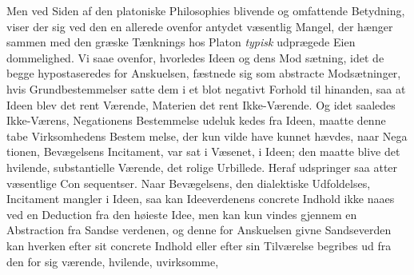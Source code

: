 \documentclass[12pt,a4paper]{book}
\begin{document}
Men ved Siden af den platoniske Philosophies blivende
og omfattende Betydning, viser der sig ved den en allerede
ovenfor antydet væsentlig Mangel, der hænger sammen med
den græske Tænknings hos Platon \emph{typisk} udprægede Eien\-%
dommelighed. Vi saae ovenfor, hvorledes Ideen og dens Mod\-%
sætning, idet de begge hypostaseredes for Anskuelsen, fæstnede
sig som abstracte Modsætninger, hvis Grundbestemmelser satte
dem i et blot negativt Forhold til hinanden, saa at Ideen
blev det rent Værende, Materien det rent Ikke-Værende. Og
idet saaledes Ikke-Værens, Negationens Bestemmelse udeluk\-%
kedes fra Ideen, maatte denne tabe Virksomhedens Bestem\-%
melse, der kun vilde have kunnet hævdes, naar Nega\-%
tionen, Bevægelsens Incitament, var sat i Væsenet, i Ideen;
den maatte blive det hvilende, substantielle Værende, det
rolige Urbillede. Heraf udspringer saa atter væsentlige Con\-%
sequentser. Naar Bevægelsens, den dialektiske Udfoldelses,
Incitament mangler i Ideen, saa kan Ideeverdenens concrete
Indhold ikke naaes ved en Deduction fra den høieste Idee,
men kan kun vindes gjennem en Abstraction fra Sandse\-%
verdenen, og denne for Anskuelsen givne Sandseverden kan
hverken efter sit concrete Indhold eller efter sin Tilværelse
begribes ud fra den for sig værende, hvilende, uvirksomme,
\end{document}
